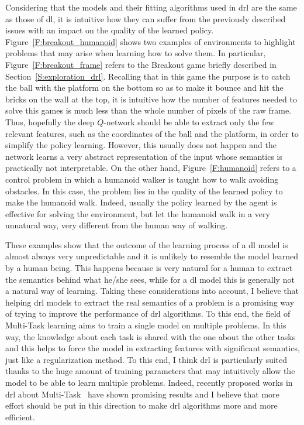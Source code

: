 Considering that the models and their fitting algorithms used in \gls{drl} are the same as those of \gls{dl}, it is intuitive how they can suffer from the previously described issues with an impact on the quality of the learned policy. Figure~\ref{F:breakout_humanoid} shows two examples of environments to highlight problems that may arise when learning how to solve them. In particular, Figure~\ref{F:breakout_frame} refers to the Breakout game briefly described in Section~\ref{S:exploration_drl}. Recalling that in this game the purpose is to catch the ball with the platform on the bottom so as to make it bounce and hit the bricks on the wall at the top, it is intuitive how the number of features needed to solve this games is much less than the whole number of pixels of the raw frame. Thus, hopefully the deep $Q$-network should be able to extract only the few relevant features, such as the coordinates of the ball and the platform, in order to simplify the policy learning. However, this usually does not happen and the network learns a very abstract representation of the input whose semantics is practically not interpretable. On the other hand, Figure~\ref{F:humanoid} refers to a control problem in which a humanoid walker is taught how to walk avoiding obstacles. In this case, the problem lies in the quality of the learned policy to make the humanoid walk. Indeed, usually the policy learned by the agent is effective for solving the environment, but let the humanoid walk in a very unnatural way, very different from the human way of walking.

These examples show that the outcome of the learning process of a \gls{dl} model is almost always very unpredictable and it is unlikely to resemble the model learned by a human being. This happens because is very natural for a human to extract the semantics behind what he/she sees, while for a \gls{dl} model this is generally not a natural way of learning. Taking these considerations into account, I believe that helping \gls{drl} models to extract the real semantics of a problem is a promising way of trying to improve the performance of \gls{drl} algorithms. To this end, the field of Multi-Task learning aims to train a single model on multiple problems. In this way, the knowledge about each task is shared with the one about the other tasks and this helps to force the model in extracting features with significant semantics, just like a regularization method. To this end, I think \gls{drl} is particularly suited thanks to the huge amount of training parameters that may intuitively allow the model to be able to learn multiple problems. Indeed, recently proposed works in \gls{drl} about Multi-Task~\cite{higgins2017darla, ammar2014online, teh2017distral} have shown promising results and I believe that more effort should be put in this direction to make \gls{drl} algorithms more and more efficient.